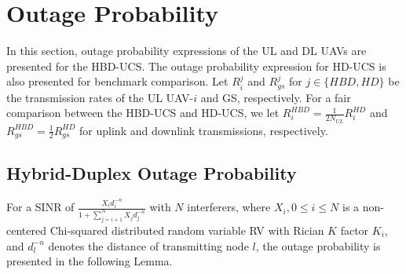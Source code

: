 \section{Outage Probability} \label{HBD_multi_UAV_sec_outage}

In this section, outage probability expressions of the UL and DL UAVs are presented for the HBD-UCS. The outage probability expression for HD-UCS is also presented for benchmark comparison. Let $R^{j}_{i}$ and $R^{j}_{gs}$ for $j \in \{HBD, HD\}$ be the transmission rates of the UL UAV-$i$ and GS, respectively. For a fair comparison between the HBD-UCS and HD-UCS, we let $R_{i}^{HBD}=\frac{1}{2N_{UL}}R_{i}^{HD}$ and $R_{gs}^{HBD}=\frac{1}{2}R_{gs}^{HD}$ for uplink and downlink transmissions, respectively.


\subsection{Hybrid-Duplex Outage Probability}
For a SINR of $\frac{X_i d_i^{-n}}{1+\sum_{j=i+1}^{N}X_j d_j^{-n}}$ with $N$ interferers, where $X_i, 0 \leq i \leq N$ is a non-centered Chi-squared distributed random variable RV with Rician $K$ factor $K_i$, and $d_{l}^{-n}$ denotes the distance of transmitting node $l$, the outage probability is presented in the following Lemma.

